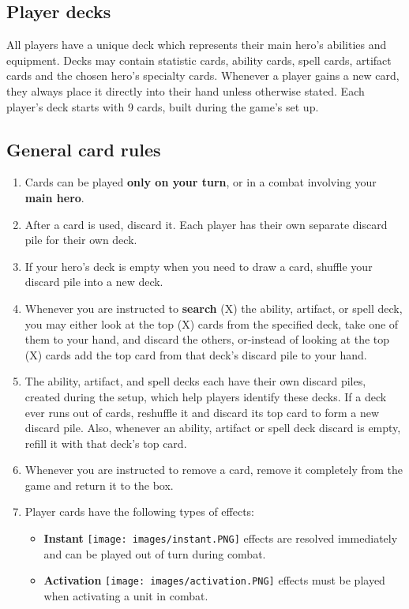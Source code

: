 \documentclass[12pt]{article}
\begin{document}
\clearpage
\subsection*{\hypertarget{Playerdecks}{Player decks}}
All players have a unique deck which represents their main hero's abilities and equipment. Decks may contain statistic cards, ability cards, spell cards, artifact cards and the chosen hero’s specialty cards. Whenever a player gains a new card, they always place it directly into their hand unless otherwise stated. Each player’s deck starts with 9 cards, built during the game’s set up.
\subsection*{General card rules}
\begin{enumerate}
	\item Cards can be played \textbf{only on your turn}, or in a combat involving your \textbf{main hero}.
	\item After a card is used, discard it. Each player has their own separate discard pile for their own deck.
	\item If your hero's deck is empty when you need to draw a card, shuffle your discard pile into a new deck.
    \item Whenever you are instructed to \textbf{search} (X) the ability, artifact, or spell deck, you may either look at the top (X) cards from the specified deck, take one of them to your hand, and discard the others, or-instead of looking at the top (X) cards add the top card from that deck’s discard pile to your hand.
    \item The ability, artifact, and spell decks each have their own discard piles, created during the setup, which help players identify these decks. If a deck ever runs out of cards, reshuffle it and discard its top card to form a new discard pile. Also, whenever an ability, artifact or spell deck discard is empty, refill it with that deck’s top card.
    \item Whenever you are instructed to remove a card, remove it completely from the game and return it to the box.
    \item Player cards have the following types of effects:
    \begin{itemize}
        \item \textbf{Instant} \texttt{[image: images/instant.PNG]} effects are resolved immediately and can be played out of turn during combat.
        \item \textbf{Activation} \texttt{[image: images/activation.PNG]} effects must be played when activating a unit in combat.

\end{itemize}
\end{enumerate}
\end{document}
